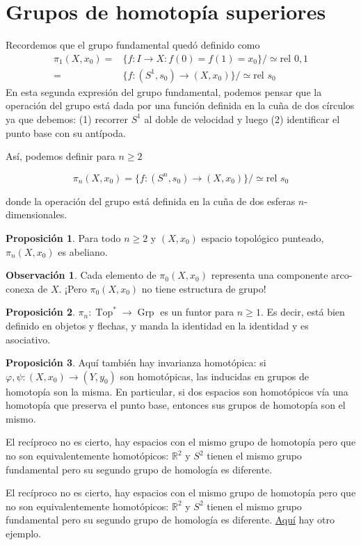 \documentclass[spanish]{book}
\theoremstyle{definition}
\newtheorem*{obs}{Observación}
\newtheorem*{prop}{Proposición}
\newcommand{\R}{\mathbb{R}}
\DeclareMathOperator{\Top}{Top}
\DeclareMathOperator{\Grp}{Grp}
\begin{document}
\section{Grupos de homotopía superiores}
	Recordemos que el grupo fundamental quedó definido como
	\begin{align*}
		\pi_1(X,x_0)=&\{f:I\to X:f(0)=f(1)=x_0\}\Big/\simeq\text{rel }0,1\\
		=&\{f:(S^1,s_0)\to(X,x_0)\}\Big/\simeq\text{rel }s_0
	\end{align*}
	En esta segunda expresión del grupo fundamental, podemos pensar que la operación del grupo está dada por una función definida en la cuña de dos círculos ya que debemos: (1) recorrer $S^1$ al doble de velocidad y luego (2) identificar el punto base con su antípoda.
	
	Así, podemos definir para $n\geq2$
	
	\[\pi_n(X,x_0)=\{f:(S^n,s_0)\to (X,x_0)\}\Big/\simeq\text{rel }s_0\]
	
	donde la operación del grupo está definida en la cuña de dos esferas $n$-dimensionales.
	
	\begin{prop}
		Para todo $n\geq 2$ y $(X,x_0)$ espacio topológico punteado, $\pi_n(X,x_0)$ es abeliano.
	\end{prop}
	\begin{obs}
		Cada elemento de $\pi_0(X,x_0)$ representa una componente arco-conexa de $X$. ¡Pero $\pi_0(X,x_0)$ no tiene estructura de grupo!
	\end{obs}
	\begin{prop}
		 $\pi_n:\Top^*\to\Grp$ es un funtor para $n\geq1$. Es decir, está bien definido en objetos y flechas, y manda la identidad en la identidad y es asociativo.
	\end{prop}
	\begin{prop}
		Aquí también hay invarianza homotópica: si $\varphi,\psi:(X,x_0)\to(Y,y_0)$ son homotópicas, las inducidas en grupos de homotopía son la misma. En particular, si dos espacios son homotópicos vía una homotopía que preserva el punto base, entonces sus grupos de homotopía son el mismo.
	\end{prop}
	El recíproco no es cierto, hay espacios con el mismo grupo de homotopía pero que no son equivalentemente homotópicos: $\R^2$ y $S^2$ tienen el mismo grupo fundamental pero su segundo grupo de homología es diferente.
	
	El recíproco no es cierto, hay espacios con el mismo grupo de homotopía pero que no son equivalentemente homotópicos: $\R^2$ y $S^2$ tienen el mismo grupo fundamental pero su segundo grupo de homología es diferente. \hyperref[ejer:homol-homot]{Aquí} hay otro ejemplo.
	
\end{document}
